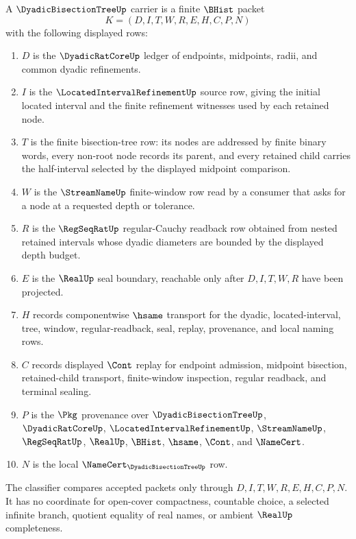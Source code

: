 \begin{definition}
\label{def:dyadic-bisection-tree-carrier}
A $\DyadicBisectionTreeUp$ carrier is a finite $\BHist$ packet
$$
K=(D,I,T,W,R,E,H,C,P,N)
$$
with the following displayed rows:
\begin{enumerate}
\item $D$ is the $\DyadicRatCoreUp$ ledger of endpoints, midpoints, radii, and common dyadic refinements.
\item $I$ is the $\LocatedIntervalRefinementUp$ source row, giving the initial located interval and the finite refinement witnesses used by each retained node.
\item $T$ is the finite bisection-tree row: its nodes are addressed by finite binary words, every non-root node records its parent, and every retained child carries the half-interval selected by the displayed midpoint comparison.
\item $W$ is the $\StreamNameUp$ finite-window row read by a consumer that asks for a node at a requested depth or tolerance.
\item $R$ is the $\RegSeqRatUp$ regular-Cauchy readback row obtained from nested retained intervals whose dyadic diameters are bounded by the displayed depth budget.
\item $E$ is the $\RealUp$ seal boundary, reachable only after $D,I,T,W,R$ have been projected.
\item $H$ records componentwise $\hsame$ transport for the dyadic, located-interval, tree, window, regular-readback, seal, replay, provenance, and local naming rows.
\item $C$ records displayed $\Cont$ replay for endpoint admission, midpoint bisection, retained-child transport, finite-window inspection, regular readback, and terminal sealing.
\item $P$ is the $\Pkg$ provenance over $\DyadicBisectionTreeUp$, $\DyadicRatCoreUp$, $\LocatedIntervalRefinementUp$, $\StreamNameUp$, $\RegSeqRatUp$, $\RealUp$, $\BHist$, $\hsame$, $\Cont$, and $\NameCert$.
\item $N$ is the local $\NameCert_{\DyadicBisectionTreeUp}$ row.
\end{enumerate}
The classifier compares accepted packets only through $D,I,T,W,R,E,H,C,P,N$. It has no coordinate for open-cover compactness, countable choice, a selected infinite branch, quotient equality of real names, or ambient $\RealUp$ completeness.
\end{definition}

